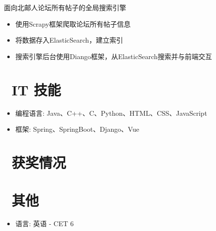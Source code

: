 \documentclass{resume}
\begin{document}
\begin{onehalfspacing}
面向北邮人论坛所有帖子的全局搜索引擎
\begin{itemize}
  \item 使用Scrapy框架爬取论坛所有帖子信息
  \item 将数据存入ElasticSearch，建立索引
  \item 搜索引擎后台使用Diango框架，从ElasticSearch搜索并与前端交互
\end{itemize}
\end{onehalfspacing}


\section{\faCogs\ IT 技能}
\begin{itemize}[parsep=0.5ex]
  \item 编程语言: Java、C++、C、Python、HTML、CSS、JavaScript
  \item 框架: Spring、SpringBoot、Django、Vue
\end{itemize}

\section{\faHeartO\ 获奖情况}

\section{\faInfo\ 其他}
\begin{itemize}[parsep=0.5ex]
  \item 语言: 英语 - CET 6
\end{itemize}

%
%
\end{document}
